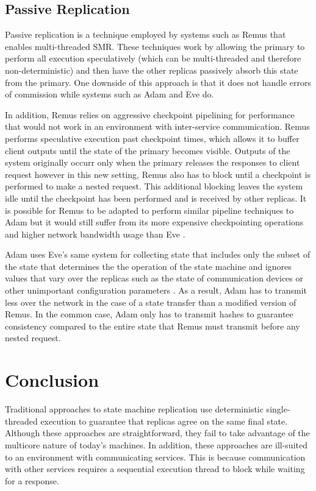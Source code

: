 \documentclass[11pt, oneside]{report}
\begin{document}
\section{Passive Replication}

Passive replication is a technique employed by systems such as Remus \cite{remus} that enables multi-threaded SMR. 
These techniques work by allowing the primary to perform all execution speculatively (which can be multi-threaded and therefore non-deterministic) and then have the other replicas passively absorb this state from the primary.
One downside of this approach is that it does not handle errors of commission  while systems such as Adam and Eve do.

In addition, Remus relies on aggressive checkpoint pipelining for performance that would not work in an environment with inter-service communication.
Remus performs speculative execution past checkpoint times, which allows it to buffer client outputs until the state of the primary becomes visible. 
Outputs of the system originally occurr only when the primary releases the responses to client request however in this new setting, Remus  also has to block until a checkpoint is performed to make a nested request. 
This additional blocking leaves the system idle until the checkpoint has been performed and is received by other replicas.
It is possible for Remus to be adapted to perform similar pipeline techniques to Adam but it would still suffer from its more expensive checkpointing operations and higher network bandwidth usage than Eve \cite{eve}. 

Adam uses Eve's same system for collecting state that includes only the subset of the state that determines the the operation of the state machine and ignores values that vary over the replicas such as the state of communication devices or other unimportant configuration parameters \cite{manosThesis}.
As a result, Adam has to transmit less over the network in the case of a state transfer than a modified version of Remus.
In the common case, Adam only has to transmit hashes to guarantee consistency compared to the entire state that Remus must transmit before any nested request.

\chapter{Conclusion}\label{Conclusion}

Traditional approaches to state machine replication use deterministic single-threaded execution to guarantee that replicas agree on the same final state. Although these approaches are straightforward, they fail to take advantage of the multicore nature of today's machines. 
In addition, these approaches are ill-suited to an environment with communicating services. This is because communication with other services requires a sequential execution thread to block while waiting for a response. 
\end{document}
